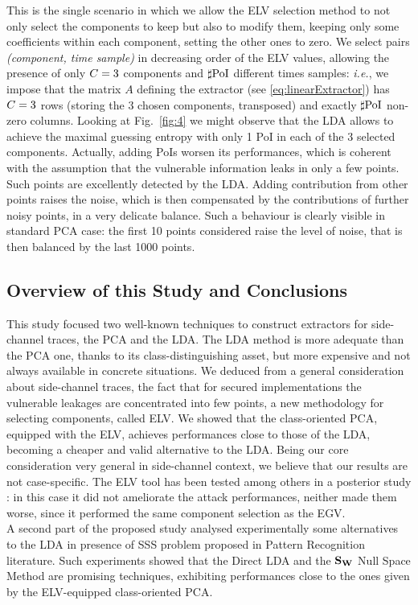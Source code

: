 This is the single scenario in which we allow the ELV selection method to not only select the components to keep but also to modify them, keeping only some coefficients within each component, setting the other ones to zero. We select pairs \textit{(component, time sample)} in decreasing order of the ELV values, allowing the presence of only $C = 3$ components and $\sharp\mathrm{PoI}$ different times samples: {\em i.e.}, we impose that the matrix $A$ defining the extractor (see \eqref{eq:linearExtractor}) has $C = 3$ rows (storing the 3 chosen components, transposed) and exactly $\sharp\mathrm{PoI}$ non-zero columns.
Looking at Fig.~\ref{fig:4} we might observe that the LDA allows to achieve the maximal guessing entropy with only 1 PoI in each of the 3 selected components. 
Actually, adding PoIs worsen its performances, which is coherent with the assumption that the vulnerable information leaks in only a few points. Such points are excellently detected by the LDA. Adding contribution from other points raises the noise, which is then compensated by the contributions of further noisy points, in a very delicate balance. Such a behaviour is clearly visible in standard PCA case: the first 10 points considered raise the level of noise, that is then balanced by the last 1000 points.


\subsection{Overview of this Study and Conclusions}


This study focused two well-known techniques to construct extractors for side-channel traces, the PCA and the LDA. The LDA method is more adequate than the PCA one, thanks to its class-distinguishing asset, but more expensive and not always available in concrete situations. We deduced from a general consideration about side-channel traces, \ie the fact that for secured implementations the vulnerable leakages are concentrated into few points, a new methodology  for selecting components, called ELV. We showed that the class-oriented PCA, equipped with the ELV, achieves performances close to those of the LDA, becoming a cheaper and valid alternative to the LDA. Being our core consideration very general in side-channel context, we believe that our results are not case-specific. The ELV tool has been tested among others in a posterior study \cite{choudary2018efficient}: in this case it did not ameliorate the attack performances, neither made them worse, since it performed the same component selection as the EGV. \\
A second part of the proposed study analysed experimentally some alternatives to the LDA in presence of SSS problem proposed in Pattern Recognition literature. Such experiments showed that the Direct LDA and the $\textbf{S}_{\textbf{W}}$ Null Space Method are promising techniques, exhibiting performances close to the ones given by the ELV-equipped class-oriented PCA.

